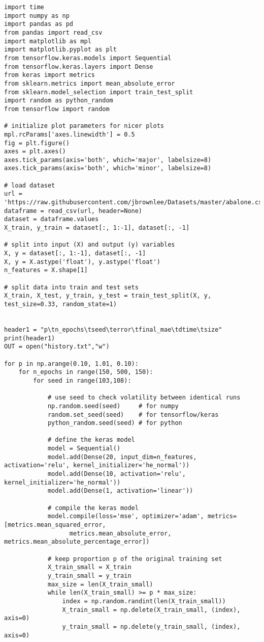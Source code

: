 \documentclass[oneside,10pt]{book}
\begin{document}
\begin{lstlisting}
import time
import numpy as np
import pandas as pd
from pandas import read_csv
import matplotlib as mpl
import matplotlib.pyplot as plt
from tensorflow.keras.models import Sequential
from tensorflow.keras.layers import Dense
from keras import metrics
from sklearn.metrics import mean_absolute_error
from sklearn.model_selection import train_test_split
import random as python_random
from tensorflow import random

# initialize plot parameters for nicer plots
mpl.rcParams['axes.linewidth'] = 0.5
fig = plt.figure() 
axes = plt.axes()
axes.tick_params(axis='both', which='major', labelsize=8)
axes.tick_params(axis='both', which='minor', labelsize=8)

# load dataset
url = 'https://raw.githubusercontent.com/jbrownlee/Datasets/master/abalone.csv'
dataframe = read_csv(url, header=None)
dataset = dataframe.values
X_train, y_train = dataset[:, 1:-1], dataset[:, -1]

# split into input (X) and output (y) variables
X, y = dataset[:, 1:-1], dataset[:, -1]
X, y = X.astype('float'), y.astype('float')
n_features = X.shape[1]

# split data into train and test sets
X_train, X_test, y_train, y_test = train_test_split(X, y, test_size=0.33, random_state=1)


header1 = "p\tn_epochs\tseed\terror\tfinal_mae\tdtime\tsize"
print(header1)
OUT = open("history.txt","w")

for p in np.arange(0.10, 1.01, 0.10):
    for n_epochs in range(150, 500, 150):
        for seed in range(103,108):

            # use seed to check volatility between identical runs
            np.random.seed(seed)     # for numpy
            random.set_seed(seed)    # for tensorflow/keras
            python_random.seed(seed) # for python

            # define the keras model
            model = Sequential()
            model.add(Dense(20, input_dim=n_features, activation='relu', kernel_initializer='he_normal'))
            model.add(Dense(10, activation='relu', kernel_initializer='he_normal'))
            model.add(Dense(1, activation='linear'))

            # compile the keras model
            model.compile(loss='mse', optimizer='adam', metrics=[metrics.mean_squared_error,
                  metrics.mean_absolute_error, metrics.mean_absolute_percentage_error])

            # keep proportion p of the original training set 
            X_train_small = X_train  
            y_train_small = y_train
            max_size = len(X_train_small)
            while len(X_train_small) >= p * max_size:
                index = np.random.randint(len(X_train_small))
                X_train_small = np.delete(X_train_small, (index), axis=0)
                y_train_small = np.delete(y_train_small, (index), axis=0)


\end{lstlisting}
\end{document}
